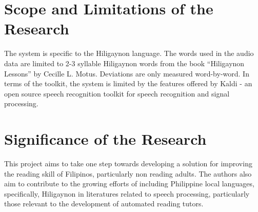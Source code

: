 \section{Scope and Limitations of the Research}
\label{sec:scopelimitations}

The system is specific to the Hiligaynon language. The words used in the audio data are limited to 2-3 syllable Hiligaynon words from the book “Hiligaynon Lessons” by Cecille L. Motus. Deviations are only measured word-by-word. In terms of the toolkit, the system is limited by the features offered by Kaldi - an open source speech recognition toolkit for speech recognition and signal processing.

\begin{comment}

%
%
Generally, one paragraph should be allotted for each of your research objectives.

Each paragraph contains a brief overview of the concept/theory and the purpose of doing the associated objective.

Each paragraph also includes a description of the scope/limitation of your study.

* Please refer to the slides for examples.

\end{comment}


\section{Significance of the Research}
\label{sec:significance}

This project aims to take one step towards developing a solution for improving the reading skill of Filipinos, particularly non reading adults. The authors also aim to contribute to the growing efforts of including Philippine local languages, specifically, Hiligaynon in literatures related to speech processing, particularly those relevant to the development of automated reading tutors.

